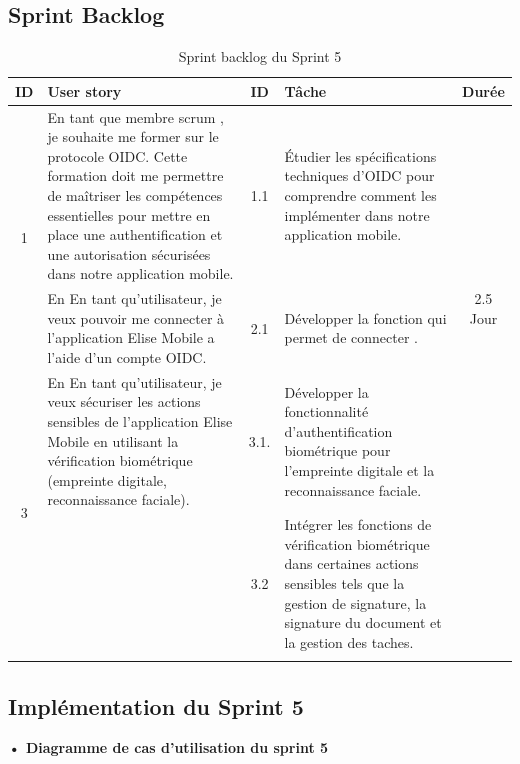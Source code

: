 \subsection{Sprint Backlog}


\begin{adjustwidth}{-1cm}{}
    
    \begin{longtable}{|c|p{6cm}|c|p{6cm}|c|}
      \hline
      \textbf{ID} & \textbf{User story} & \textbf{ID}  & \textbf{Tâche} & \textbf{Durée} \\
      \hline
      \multirow{2}{*}{1} & En tant que membre scrum , je souhaite me former sur le protocole OIDC. Cette formation doit me permettre de maîtriser les compétences essentielles pour mettre en place une authentification et une autorisation sécurisées dans notre application mobile.
      & 1.1 & Étudier les spécifications techniques d'OIDC pour comprendre comment les implémenter dans notre application mobile. & \multirow{3}{*}{2.5 Jour} \\
      \cline{1-5}
      \multirow{2}{*}{2} & En En tant qu'utilisateur, je veux pouvoir me connecter à l'application Elise Mobile a l'aide d'un compte OIDC. & 2.1 & Développer la fonction qui permet de connecter . &  \multirow{3}{*}{2.5 Jour} \\
      \cline{1-5}
      \multirow{2}{*}{3} & En En tant qu’utilisateur, je veux sécuriser les actions sensibles de l’application Elise Mobile en utilisant la vérification biométrique (empreinte digitale, reconnaissance faciale). & 3.1.& Développer la fonctionnalité d'authentification biométrique pour l'empreinte digitale et la reconnaissance faciale. & \multirow{2}{*}{0.5 Jour} \\
      \cline{3-4}
      & & 3.2 & Intégrer les fonctions de vérification biométrique dans certaines actions sensibles tels que la gestion de signature, la signature du document et la gestion des taches. & \\
      \cline{1-5}
  \hline
  \caption{Sprint backlog du Sprint 5}
  \label{tab:sprint-backlog-5}
\end{longtable}
\end{adjustwidth}


\subsection{Implémentation du Sprint 5}
\textbf{•	Diagramme de cas d'utilisation du sprint 5}

